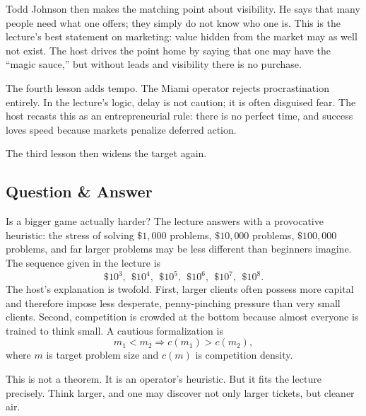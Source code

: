 Todd Johnson then makes the matching point about visibility. He says that many people need what one offers; they simply do not know who one is. This is the lecture's best statement on marketing: value hidden from the market may as well not exist. The host drives the point home by saying that one may have the ``magic sauce,'' but without leads and visibility there is no purchase.

The fourth lesson adds tempo. The Miami operator rejects procrastination entirely. In the lecture's logic, delay is not caution; it is often disguised fear. The host recasts this as an entrepreneurial rule: there is no perfect time, and success loves speed because markets penalize deferred action.

The third lesson then widens the target again.

\subsection{Question \& Answer}

Is a bigger game actually harder? The lecture answers with a provocative heuristic: the stress of solving \(\$1{,}000\) problems, \(\$10{,}000\) problems, \(\$100{,}000\) problems, and far larger problems may be less different than beginners imagine. The sequence given in the lecture is
\begin{equation}
\$10^3,\ \ \$10^4,\ \ \$10^5,\ \ \$10^6,\ \ \$10^7,\ \ \$10^8.
\end{equation}
The host's explanation is twofold. First, larger clients often possess more capital and therefore impose less desperate, penny-pinching pressure than very small clients. Second, competition is crowded at the bottom because almost everyone is trained to think small. A cautious formalization is
\begin{equation}
m_1 < m_2 \Rightarrow c(m_1) > c(m_2),
\end{equation}
where \(m\) is target problem size and \(c(m)\) is competition density.

This is not a theorem. It is an operator's heuristic. But it fits the lecture precisely. Think larger, and one may discover not only larger tickets, but cleaner air.

\begin{figure}[h]
\centering
{}
\end{figure}

